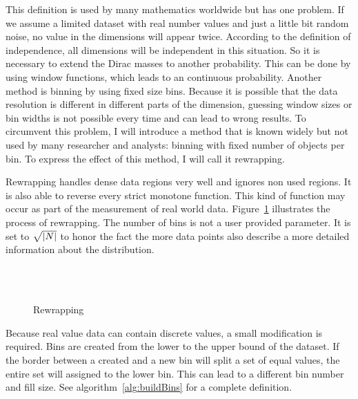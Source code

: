 This definition is used by many mathematics worldwide but has one problem. If we assume a limited dataset with real number values and just a little bit random noise, no value in the dimensions will appear twice. According to the definition of independence, all dimensions will be independent in this situation. So it is necessary to extend the Dirac masses to another probability. This can be done by using window functions, which leads to an continuous probability. Another method is binning by using fixed size bins. Because it is possible that the data resolution is different in different parts of the dimension, guessing window sizes or bin widths is not possible every time and can lead to wrong results. To circumvent this problem, I will introduce a method that is known widely but not used by many researcher and analysts: binning with fixed number of objects per bin. To express the effect of this method, I will call it rewrapping.

Rewrapping handles dense data regions very well and ignores non used regions. It is also able to reverse every strict monotone function. This kind of function may occur as part of the measurement of real world data. Figure~\ref{fig:rewrap} illustrates the process of rewrapping. The number of bins is not a user provided parameter. It is set to $\sqrt{\left|N\right|}$ to honor the fact the more data points also describe a more detailed information about the distribution.

\begin{figure}
	\caption{Rewrapping}
	\label{fig:rewrap}
	\centering
	\hfill
	\\
	\hfill
	\\
	\hfill
\end{figure}

Because real value data can contain discrete values, a small modification is required. Bins are created from the lower to the upper bound of the dataset. If the border between a created and a new bin will split a set of equal values, the entire set will assigned to the lower bin. This can lead to a different bin number and fill size. See algorithm~\ref{alg:buildBins} for a complete definition.

